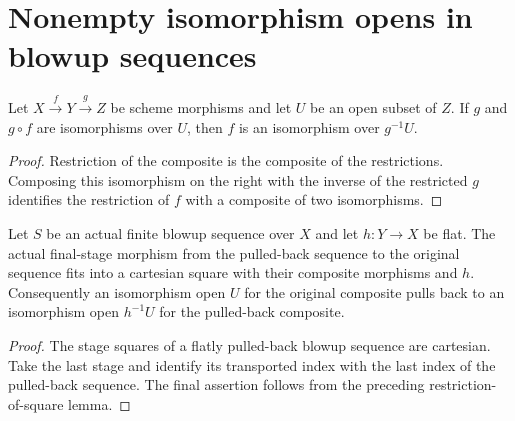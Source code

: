 \section{Nonempty isomorphism opens in blowup sequences}

\begin{lemma}\label{lem:sc0-open-iso-cancellation}
\leanok
Let $X\xrightarrow{f}Y\xrightarrow{g}Z$ be scheme morphisms and let $U$ be an open
subset of $Z$. If $g$ and $g\circ f$ are isomorphisms over $U$, then $f$ is an
isomorphism over $g^{-1}U$.
\end{lemma}
\begin{proof}
Restriction of the composite is the composite of the restrictions. Composing this
isomorphism on the right with the inverse of the restricted $g$ identifies the
restriction of $f$ with a composite of two isomorphisms.
\end{proof}

\begin{lemma}\label{lem:sc0-sequence-last-pullback}
\leanok
{}
Let $S$ be an actual finite blowup sequence over $X$ and let $h:Y\to X$ be flat.
The actual final-stage morphism from the pulled-back sequence to the original
sequence fits into a cartesian square with their composite morphisms and $h$.
Consequently an isomorphism open $U$ for the original composite pulls back to an
isomorphism open $h^{-1}U$ for the pulled-back composite.
\end{lemma}
\begin{proof}
The stage squares of a flatly pulled-back blowup sequence are cartesian. Take the
last stage and identify its transported index with the last index of the pulled-back
sequence. The final assertion follows from the preceding restriction-of-square lemma.
\end{proof}

